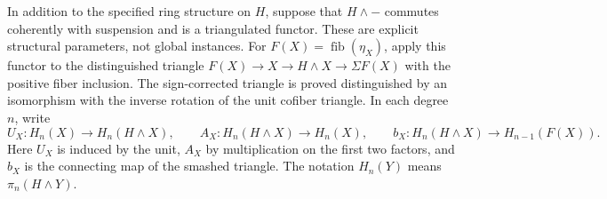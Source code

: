 \begin{definition}
  \label{def:h6-homology-resolution}
  \leanok
  In addition to the specified ring structure on $H$, suppose that
  $H\wedge-$ commutes coherently with suspension and is a triangulated
  functor. These are explicit structural parameters, not global instances.
  For $F(X)=\operatorname{fib}(\eta_X)$, apply this functor to the
  distinguished triangle
  $F(X)\to X\to H\wedge X\to\Sigma F(X)$ with the positive fiber
  inclusion. The sign-corrected triangle is proved distinguished by an
  isomorphism with the inverse rotation of the unit cofiber triangle.
  In each degree $n$, write
  \[
    U_X:H_n(X)\to H_n(H\wedge X),\qquad
    A_X:H_n(H\wedge X)\to H_n(X),\qquad
    b_X:H_n(H\wedge X)\to H_{n-1}(F(X)).
  \]
  Here $U_X$ is induced by the unit, $A_X$ by multiplication on the first
  two factors, and $b_X$ is the connecting map of the smashed triangle.
  The notation $H_n(Y)$ means $\pi_n(H\wedge Y)$.
\end{definition}

